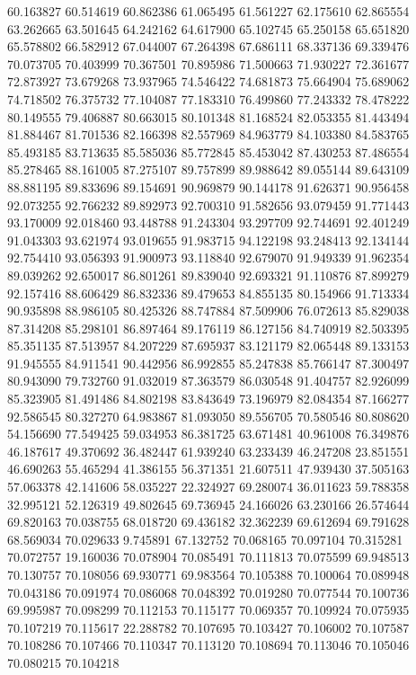 60.163827
60.514619
60.862386
61.065495
61.561227
62.175610
62.865554
63.262665
63.501645
64.242162
64.617900
65.102745
65.250158
65.651820
65.578802
66.582912
67.044007
67.264398
67.686111
68.337136
69.339476
70.073705
70.403999
70.367501
70.895986
71.500663
71.930227
72.361677
72.873927
73.679268
73.937965
74.546422
74.681873
75.664904
75.689062
74.718502
76.375732
77.104087
77.183310
76.499860
77.243332
78.478222
80.149555
79.406887
80.663015
80.101348
81.168524
82.053355
81.443494
81.884467
81.701536
82.166398
82.557969
84.963779
84.103380
84.583765
85.493185
83.713635
85.585036
85.772845
85.453042
87.430253
87.486554
85.278465
88.161005
87.275107
89.757899
89.988642
89.055144
89.643109
88.881195
89.833696
89.154691
90.969879
90.144178
91.626371
90.956458
92.073255
92.766232
89.892973
92.700310
91.582656
93.079459
91.771443
93.170009
92.018460
93.448788
91.243304
93.297709
92.744691
92.401249
91.043303
93.621974
93.019655
91.983715
94.122198
93.248413
92.134144
92.754410
93.056393
91.900973
93.118840
92.679070
91.949339
91.962354
89.039262
92.650017
86.801261
89.839040
92.693321
91.110876
87.899279
92.157416
88.606429
86.832336
89.479653
84.855135
80.154966
91.713334
90.935898
88.986105
80.425326
88.747884
87.509906
76.072613
85.829038
87.314208
85.298101
86.897464
89.176119
86.127156
84.740919
82.503395
85.351135
87.513957
84.207229
87.695937
83.121179
82.065448
89.133153
91.945555
84.911541
90.442956
86.992855
85.247838
85.766147
87.300497
80.943090
79.732760
91.032019
87.363579
86.030548
91.404757
82.926099
85.323905
81.491486
84.802198
83.843649
73.196979
82.084354
87.166277
92.586545
80.327270
64.983867
81.093050
89.556705
70.580546
80.808620
54.156690
77.549425
59.034953
86.381725
63.671481
40.961008
76.349876
46.187617
49.370692
36.482447
61.939240
63.233439
46.247208
23.851551
46.690263
55.465294
41.386155
56.371351
21.607511
47.939430
37.505163
57.063378
42.141606
58.035227
22.324927
69.280074
36.011623
59.788358
32.995121
52.126319
49.802645
69.736945
24.166026
63.230166
26.574644
69.820163
70.038755
68.018720
69.436182
32.362239
69.612694
69.791628
68.569034
70.029633
9.745891
67.132752
70.068165
70.097104
70.315281
70.072757
19.160036
70.078904
70.085491
70.111813
70.075599
69.948513
70.130757
70.108056
69.930771
69.983564
70.105388
70.100064
70.089948
70.043186
70.091974
70.086068
70.048392
70.019280
70.077544
70.100736
69.995987
70.098299
70.112153
70.115177
70.069357
70.109924
70.075935
70.107219
70.115617
22.288782
70.107695
70.103427
70.106002
70.107587
70.108286
70.107466
70.110347
70.113120
70.108694
70.113046
70.105046
70.080215
70.104218
